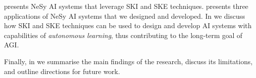 \begin{refsection}
 presents \gls{NeSy} \gls{AI} systems that leverage \gls{SKI} and \gls{SKE} techniques.
%
 presents three applications of \gls{NeSy} \gls{AI} systems that we designed and developed.
%
In  we discuss how \gls{SKI} and \gls{SKE} techniques can be used to design and develop \gls{AI} systems with capabilities of \emph{autonomous learning}, thus contributing to the long-term goal of \gls{AGI}.

Finally, in  we summarise the main findings of the research, discuss its limitations, and outline directions for future work.



\printbibliography[title=Reference,heading=bibintoc]

\end{refsection}